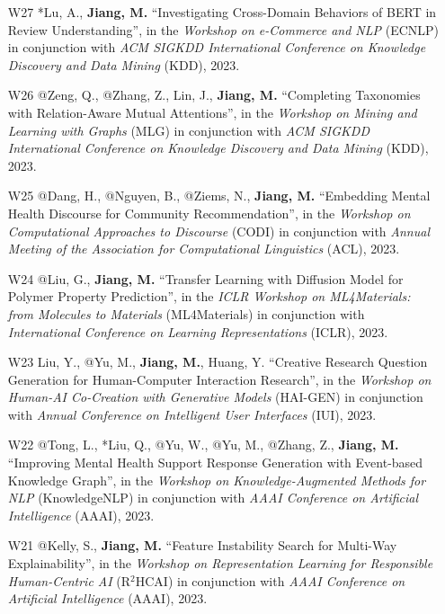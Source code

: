 \documentclass[10pt]{article}
\newenvironment{myindentpar}[1]%
{\begin{list}{}%
         {\setlength{\leftmargin}{#1}}%
         \item[]%
}
{\end{list}}
\newcounter{list}
\begin{document}
\begin{myindentpar}{0.00cm}
\begin{enumerate}[leftmargin=.5cm]
\item[W27] *Lu, A., \textbf{Jiang, M.} ``Investigating Cross-Domain Behaviors of BERT in Review Understanding'', in the \textit{Workshop on e-Commerce and NLP} (ECNLP) in conjunction with \textit{ACM SIGKDD International Conference on Knowledge Discovery and Data Mining} (KDD), 2023.

\item[W26] @Zeng, Q., @Zhang, Z., Lin, J., \textbf{Jiang, M.} ``Completing Taxonomies with Relation-Aware Mutual Attentions'', in the \textit{Workshop on Mining and Learning with Graphs} (MLG) in conjunction with \textit{ACM SIGKDD International Conference on Knowledge Discovery and Data Mining} (KDD), 2023.

\item[W25] @Dang, H., @Nguyen, B., @Ziems, N., \textbf{Jiang, M.} ``Embedding Mental Health Discourse for Community Recommendation'', in the \textit{Workshop on Computational Approaches to Discourse} (CODI) in conjunction with \textit{Annual Meeting of the Association for Computational Linguistics} (ACL), 2023.

\item[W24] @Liu, G., \textbf{Jiang, M.} ``Transfer Learning with Diffusion Model for Polymer Property Prediction'', in the \textit{ICLR Workshop on ML4Materials: from Molecules to Materials} (ML4Materials) in conjunction with \textit{International Conference on Learning Representations} (ICLR), 2023.

\item[W23] Liu, Y., @Yu, M., \textbf{Jiang, M.}, Huang, Y. ``Creative Research Question Generation for Human-Computer Interaction Research'', in the \textit{Workshop on Human-AI Co-Creation with Generative Models} (HAI-GEN) in conjunction with \textit{Annual Conference on Intelligent User Interfaces} (IUI), 2023.

\item[W22] @Tong, L., *Liu, Q., @Yu, W., @Yu, M., @Zhang, Z., \textbf{Jiang, M.} ``Improving Mental Health Support Response Generation with Event-based Knowledge Graph'', in the \textit{Workshop on Knowledge-Augmented Methods for NLP} (KnowledgeNLP) in conjunction with \textit{AAAI Conference on Artificial Intelligence} (AAAI), 2023.

\item[W21] @Kelly, S., \textbf{Jiang, M.} ``Feature Instability Search for Multi-Way Explainability'', in the \textit{Workshop on Representation Learning for Responsible Human-Centric AI} (R$^2$HCAI) in conjunction with \textit{AAAI Conference on Artificial Intelligence} (AAAI), 2023.


\end{enumerate}
\end{myindentpar}
\end{document}
